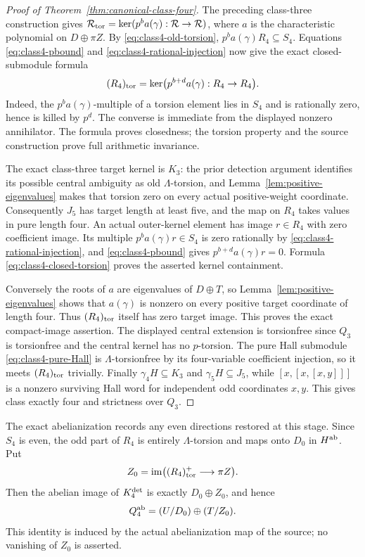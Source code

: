 \begin{proof}[Proof of Theorem~\ref{thm:canonical-class-four}]
The preceding class-three construction gives
$\mathcal R_{\rm tor}=\ker(p^ba(\gamma):\mathcal R\to\mathcal R)$, where $a$
is the characteristic polynomial on $D\oplus\pi Z$.
By \eqref{eq:class4-old-torsion},
$p^ba(\gamma)R_4\subseteq S_4$. Equations
\eqref{eq:class4-pbound} and
\eqref{eq:class4-rational-injection} now give the exact
closed-submodule formula
\begin{equation}\label{eq:class4-closed-torsion}
 (R_4)_{\rm tor}
       =\ker\bigl(p^{b+d}a(\gamma):R_4\to R_4\bigr).
\end{equation}
Indeed, the $p^ba(\gamma)$-multiple of a torsion element
lies in $S_4$ and is rationally zero, hence is killed
by $p^d$. The converse is immediate from the displayed
nonzero annihilator. The formula proves closedness;
the torsion property and the source construction prove
full arithmetic invariance.

The exact class-three target kernel is $K_3$:
the prior detection argument identifies its possible
central ambiguity as old $\Lambda$-torsion, and
Lemma~\ref{lem:positive-eigenvalues} makes that torsion
zero on every actual positive-weight coordinate.
Consequently $J_5$ has target length at least five,
and the map on $R_4$ takes values in pure length four.
An actual outer-kernel element has image $r\in R_4$
with zero coefficient image. Its multiple
$p^ba(\gamma)r\in S_4$ is zero rationally by
\eqref{eq:class4-rational-injection}, and
\eqref{eq:class4-pbound} gives
$p^{b+d}a(\gamma)r=0$. Formula
\eqref{eq:class4-closed-torsion} proves the asserted
kernel containment.

Conversely the roots of $a$ are eigenvalues of
$D\oplus T$, so Lemma~\ref{lem:positive-eigenvalues}
shows that $a(\gamma)$ is nonzero on every positive
target coordinate of length four. Thus
$(R_4)_{\rm tor}$ itself has zero target image.
This proves the exact compact-image assertion.
The displayed central extension is torsionfree since
$Q_3$ is torsionfree and the central kernel has no
$p$-torsion. The pure Hall submodule
\eqref{eq:class4-pure-Hall} is $\Lambda$-torsionfree by
its four-variable coefficient injection, so it meets
$(R_4)_{\rm tor}$ trivially. Finally
$\gamma_4H\subseteq K_3$ and $\gamma_5H\subseteq J_5$,
while $[x,[x,[x,y]]]$ is a nonzero surviving Hall word
for independent odd coordinates $x,y$. This gives
class exactly four and strictness over $Q_3$.
\end{proof}

The exact abelianization records any even directions
restored at this stage. Since $S_4$ is even, the odd
part of $R_4$ is entirely $\Lambda$-torsion and maps
onto $D_0$ in $H^{\rm ab}$. Put
\[
 Z_0=\operatorname{im}\bigl((R_4)_{\rm tor}^+
                                     \longrightarrow\pi Z\bigr).
\]
Then the abelian image of $K_4^{\rm det}$ is exactly
$D_0\oplus Z_0$, and hence
\[
                       Q_4^{\rm ab}=(U/D_0)\oplus(T/Z_0).
\]
This identity is induced by the actual abelianization
map of the source; no vanishing of $Z_0$ is asserted.

